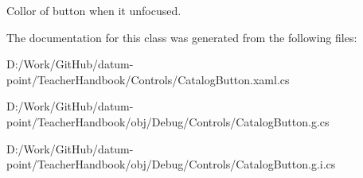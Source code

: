 Collor of button when it unfocused. 



The documentation for this class was generated from the following files\+:\begin{DoxyCompactItemize}
\item 
D\+:/\+Work/\+Git\+Hub/datum-\/point/\+Teacher\+Handbook/\+Controls/Catalog\+Button.\+xaml.\+cs\item 
D\+:/\+Work/\+Git\+Hub/datum-\/point/\+Teacher\+Handbook/obj/\+Debug/\+Controls/Catalog\+Button.\+g.\+cs\item 
D\+:/\+Work/\+Git\+Hub/datum-\/point/\+Teacher\+Handbook/obj/\+Debug/\+Controls/Catalog\+Button.\+g.\+i.\+cs\end{DoxyCompactItemize}
